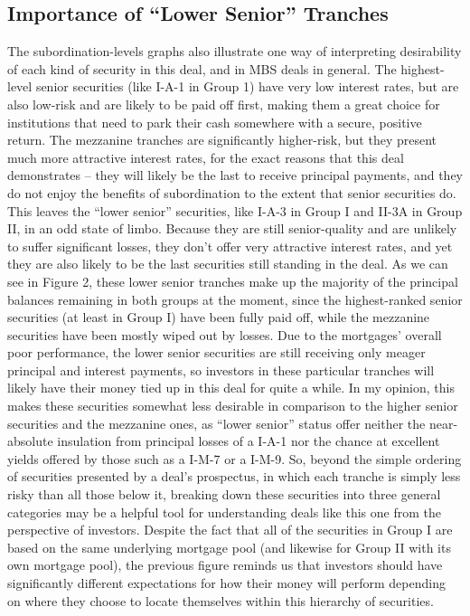 \documentclass[12pt]{article}
\begin{document}
\subsection*{Importance of ``Lower Senior'' Tranches}

The subordination-levels graphs also illustrate one way of interpreting desirability of each kind of security in this deal, and in MBS deals in general. The highest-level senior securities (like I-A-1 in Group 1) have very low interest rates, but are also low-risk and are likely to be paid off first, making them a great choice for institutions that need to park their cash somewhere with a secure, positive return. The mezzanine tranches are significantly higher-risk, but they present much more attractive interest rates, for the exact reasons that this deal demonstrates – they will likely be the last to receive principal payments, and they do not enjoy the benefits of subordination to the extent that senior securities do. This leaves the “lower senior” securities, like I-A-3 in Group I and II-3A in Group II, in an odd state of limbo. Because they are still senior-quality and are unlikely to suffer significant losses, they don’t offer very attractive interest rates, and yet they are also likely to be the last securities still standing in the deal. As we can see in Figure 2, these lower senior tranches make up the majority of the principal balances remaining in both groups at the moment, since the highest-ranked senior securities (at least in Group I) have been fully paid off, while the mezzanine securities have been mostly wiped out by losses. Due to the mortgages’ overall poor performance, the lower senior securities are still receiving only meager principal and interest payments, so investors in these particular tranches will likely have their money tied up in this deal for quite a while. In my opinion, this makes these securities somewhat less desirable in comparison to the higher senior securities and the mezzanine ones, as “lower senior” status offer neither the near-absolute insulation from principal losses of a I-A-1 nor the chance at excellent yields offered by those such as a I-M-7 or a I-M-9. So, beyond the simple ordering of securities presented by a deal’s prospectus, in which each tranche is simply less risky than all those below it, breaking down these securities into three general categories may be a helpful tool for understanding deals like this one from the perspective of investors. Despite the fact that all of the securities in Group I are based on the same underlying mortgage pool (and likewise for Group II with its own mortgage pool), the previous figure reminds us that investors should have significantly different expectations for how their money will perform depending on where they choose to locate themselves within this hierarchy of securities.
\end{document}

